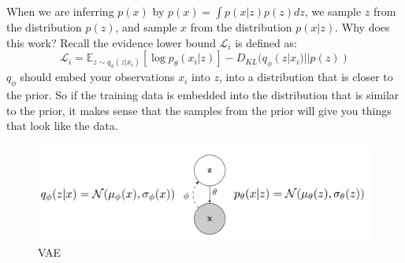 When we are inferring $p(x)$ by $p(x) = \int p(x|z)p(z)dz$, we sample $z$ from the distribution $p(z)$, and sample $x$ from the distribution $p(x|z)$. Why does this work? Recall the evidence lower bound $\mathcal{L}_i$ is defined as:
\[
\mathcal{L}_i=  \mathbb{E}_{z\sim q_\phi(z|x_i)}\left[\log p_\theta(x_i|z)\right] - D_{KL}(q_\phi(z|x_i)||p(z))
\]
$q_\phi$ should embed your observations $x_i$ into $z$, into a distribution that is closer to the prior. So if the training data is embedded into the distribution that is similar to the prior, it makes sense that the samples from the prior will give you things that look like the data.
\begin{figure}[H]
    \centering
    \includegraphics[scale=0.4]{figures/vae.png}
    \caption{VAE}
    \label{fig:vae}
\end{figure}